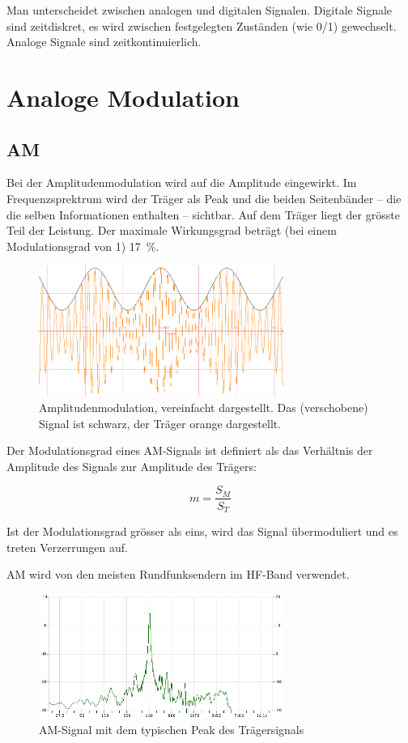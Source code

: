 Man unterscheidet zwischen analogen und digitalen Signalen. Digitale Signale sind zeitdiskret, es wird zwischen festgelegten Zuständen (wie 0/1) gewechselt. Analoge Signale sind zeitkontinuierlich. 

\section{Analoge Modulation}

\subsection{AM}
Bei der Amplitudenmodulation wird auf die Amplitude eingewirkt. Im Frequenzsprektrum wird der Träger als Peak und die beiden Seitenbänder – die die selben Informationen enthalten – sichtbar. Auf dem Träger liegt der grösste Teil der Leistung. Der maximale Wirkungsgrad beträgt (bei einem Modulationsgrad von 1) 17 \%.

\begin{figure}[h!]
 \centering
 \includegraphics[width=8cm]{./png/Graph_AM.png}
 \caption{Amplitudenmodulation, vereinfacht dargestellt. Das (verschobene) Signal ist schwarz, der Träger orange dargestellt.}
 \label{fig:am}
\end{figure}

Der Modulationsgrad eines AM-Signals ist definiert als das Verhältnis der Amplitude des Signals zur Amplitude des Trägers:

\[
 m = \frac{S_M}{S_T}
\]


Ist der Modulationsgrad grösser als eins, wird das Signal übermoduliert und es treten Verzerrungen auf. 

AM wird von den meisten Rundfunksendern im HF-Band verwendet.

\begin{figure}[h!]
 \centering
 \includegraphics[width=8cm]{./png/AM-Analysis.png}
 \caption{AM-Signal mit dem typischen Peak des Trägersignals}
 \label{fig:amAnalysis}
\end{figure}

